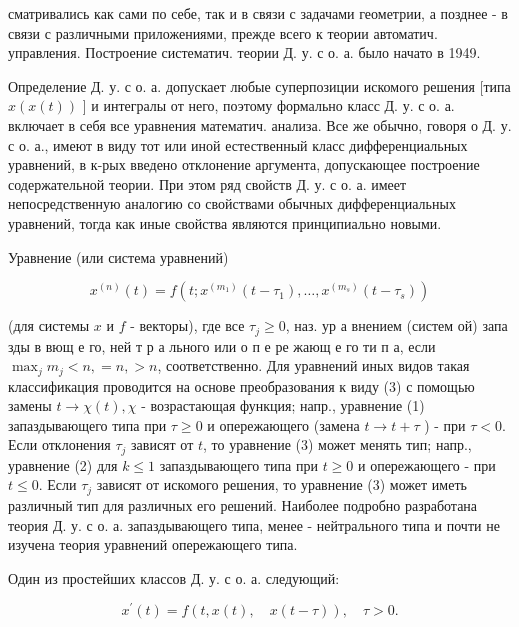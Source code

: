\documentclass[10pt]{article}
\begin{document}
сматривались как сами по себе, так и в связи с задачами геометрии, а позднее - в связи с различными приложениями, прежде всего к теории автоматич. управления. Построение систематич. теории Д. у. с о. а. было начато в 1949.



Определение Д. у. с о. а. допускает любые суперпозиции искомого решения [типа $x(x(t))$ ] и интегралы от него, поэтому формально класс Д. у. с о. а. включает в себя все уравнения математич. анализа. Все же обычно, говоря о Д. у. с о. а., имеют в виду тот или иной естественный класс дифференциальных уравнений, в к-рых введено отклонение аргумента, допускающее построение содержательной теории. При этом ряд свойств Д. у. с о. а. имеет непосредственную аналогию со свойствами обычных дифференциальных уравнений, тогда как иные свойства являются принципиально новыми.



Уравнение (или система уравнений)



\[

x^{(n)}(t)=f\left(t ; x^{\left(m_{1}\right)}\left(t-\tau_{1}\right), \ldots, x^{\left(m_{s}\right)}\left(t-\tau_{s}\right)\right)

\]



(для системы $x$ и $f$ - векторы), где все $\tau_{j} \geqslant 0$, наз. ур а внением (систем ой) запа зды в вющ е го, ней т р а льного или о п е ре жающ е го ти п а, если $\max _{j} m_{j}<n,=n,>n$, соответственно. Для уравнений иных видов такая классификация проводится на основе преобразования к виду (3) с помощью замены $t \rightarrow \chi(t), \chi$ - возрастающая функция; напр., уравнение (1) запаздывающего типа при $\tau \geqslant 0$ и опережающего (замена $t \rightarrow t+\tau$ ) - при $\tau<0$. Если отклонения $\tau_{j}$ зависят от $t$, то уравнение (3) может менять тип; напр., уравнение (2) для $k \leqslant 1$ запаздывающего типа при $t \geqslant 0$ и опережающего - при $t \leqslant 0$. Если $\tau_{j}$ зависят от искомого решения, то уравнение (3) может иметь различный тип для различных его решений. Наиболее подробно разработана теория Д. у. с о. а. запаздывающего типа, менее - нейтрального типа и почти не изучена теория уравнений опережающего типа.



Один из простейших классов Д. у. с о. а. следующий:



\[

x^{\prime}(t)=f(t, x(t), \quad x(t-\tau)), \quad \tau>0 .

\]
\end{document}

